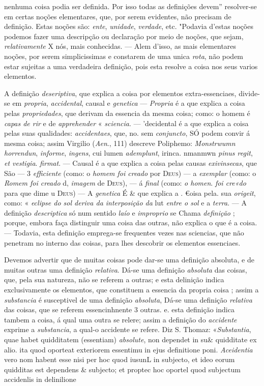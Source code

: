 nenhuma coisa podia ser definida. Por isso todas as definições devem” resolver-se em certas noções elementares, que, por serem evidentes, não precisam de definição. Estas noções são: \emph{ente}, \emph{unidade}, \emph{verdade}, etc. "Podavia d'estas noções podemos fazer uma descripção ou declaração por meio de noções, que sejam, \emph{relativamente} X nós, mais conhecidas. --- Alem d'isso, as mais elementares noções, por serem simplicissimas e constarem de uma unica \emph{rota}, não podem estar sujeitas a uma verdadeira definição, pois esta resolve a coisa nos seus varios elementos.

A definição \emph{deseriptiva}, que explica a coisa por elementos extra-essenciaes, divide-se em \emph{propria}, \emph{accidental}, causal e \emph{genetica} --- \emph{Propria} é a que explica a coisa pelas \emph{propriedades}, que derivam da essencia da mesma coisa; como: o homem é \emph{capas de rir} e de \emph{apprehender} « \emph{sciencia}. --- 'decidental é a que explica a coisa pelas suas qualidades: \emph{accidentaes}, que, no. sem \emph{conjuncto}, SÓ podem convir á mesma coisa; assim Virgilio (\emph{Aen}., 111) descreve Poliphemo: \emph{Monstrwumn horrendun}, \emph{informe}, \emph{ingens}, cui lumen \emph{ademplunt}, irinca. nmanmwn \emph{pinus regit}, \emph{et vestigia}. \emph{firmat}. --- Causal é a que explica a coisa pelas causas \emph{exivinsecas}, que São --- 3 \emph{efficiente} (como: o \emph{homem foi creado} por \textsc{Deus}) --- a \emph{exemplar} (como: o \emph{Romem foi creado} d, \emph{imagem} de \textsc{Deus}), --- á \emph{final} (como: \emph{o homen}. \emph{foi cre«do} para que dime u \textsc{Deus}) --- A \emph{genetica} É \& que explica a . €oisa pela. sua \emph{origeit}, como: « \emph{eclipse do sol deriva da interposição da} lut \emph{entre o sol} e a \emph{terra}. --- A definição \emph{descriptica} só num sentido \emph{laío} e \emph{improprio} se Chama \emph{definição} ; porque, embora faça distinguir uma coisa das outras, não explica o que é a coisa. --- Todavia, esta definição emprega-se frequentes vezes nas sciencias, que não penetram no interno das coisas, para lhes descobrir os elementos essenciaes.

Devemos advertir que de muitas coisas pode dar-se uma definição absoluta, e de muitas outras uma definição \emph{relativa}. Dá-se uma definição \emph{absoluta} das coisas, que, pela sua natureza, não se referem a outras; e esta delinição indica exclusivamente os elementos, que constituem a essencia da propria coisa ; assim a \emph{substancia} é susceptivel de uma definição \emph{absoluta}, Dá-se uma definição \emph{relativa} das coisas, que se referem essencinhnente 3 outras. e. esta definição indica tambem a coisa, á qual uma outra se relere; assim a definição do \emph{accidente} exprime a \emph{substancia}, a qual-o accidente se refere. Diz S. Thomaz: «\emph{Substantia}, quae habet quidditatem (essentiam) \emph{absolute}, non dependet in su\& quidditate ex alio. ita quod oporteat exteriorem essentimu in ejus definitione poni. \emph{Aceidentia} vero nom habent esse nisi per hoc quod iusunL in subjecto, et ideo eorum quidditas est dependens \& subjecto; et proptec hoc oportel quod subjectum accidenlis in delinilione

